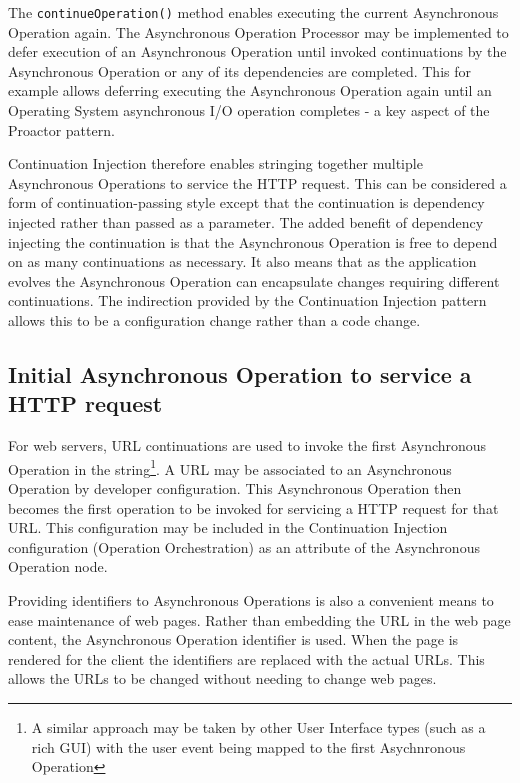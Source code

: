 \documentclass[prodmode]{style/acmlarge}
\begin{document}
The \texttt{continueOperation()} method enables executing the current
Asynchronous Operation again.  The Asynchronous Operation Processor may be
implemented to defer execution of an Asynchronous Operation until invoked
continuations by the Asynchronous Operation or any of its dependencies are
completed.  This for example allows deferring executing the Asynchronous
Operation again until an Operating System asynchronous I/O operation completes -
a key aspect of the Proactor pattern.

Continuation Injection therefore enables stringing together multiple
Asynchronous Operations to service the HTTP request.  This can be considered a
form of continuation-passing style \cite{continuations} except that the
continuation is dependency injected rather than passed as a parameter.  The
added benefit of dependency injecting the continuation is that the Asynchronous
Operation is free to depend on as many continuations as necessary.  It also
means that as the application evolves the Asynchronous Operation can encapsulate
changes requiring different continuations.  The indirection provided by the
Continuation Injection pattern allows this to be a configuration change rather
than a code change.


\subsection{Initial Asynchronous Operation to service a HTTP request}

For web servers, URL continuations \cite{url-continuation} are used to invoke
the first Asynchronous Operation in the string\footnote{A similar approach may
be taken by other User Interface types (such as a rich GUI) with the user event
being mapped to the first Asychnronous Operation}.  A URL may be associated to
an Asynchronous Operation by developer configuration.  This Asynchronous
Operation then becomes the first operation to be invoked for servicing a HTTP
request for that URL.  This configuration may be included in the Continuation
Injection configuration (Operation Orchestration) as an attribute of the
Asynchronous Operation node.

Providing identifiers to Asynchronous Operations is also a convenient means to
ease maintenance of web pages.  Rather than embedding the URL in the web page
content, the Asynchronous Operation identifier is used.  When the page is
rendered for the client the identifiers are replaced with the actual URLs.
This allows the URLs to be changed without needing to change web pages.
\end{document}
